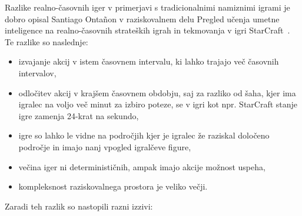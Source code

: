 \documentclass[a4paper, 12pt]{book}
\begin{document}
Razlike realno-časovnih iger v primerjavi s tradicionalnimi namiznimi igrami je dobro opisal Santiago Ontañon v raziskovalnem delu Pregled učenja umetne inteligence na realno-časovnih strateških igrah in tekmovanja v igri StarCraft~\cite{survey_real_time_strategy_ai_research_starcraft}.
Te razlike so naslednje:
\begin{itemize}
	\item izvajanje akcij v istem časovnem intervalu, ki lahko trajajo več časovnih intervalov,
	\item odločitev akcij v krajšem časovnem obdobju, saj za razliko od šaha, kjer ima igralec na voljo več minut za izbiro poteze, se v igri kot npr. StarCraft stanje igre zamenja 24-krat na sekundo,
	\item igre so lahko le vidne na področjih kjer je igralec že raziskal določeno področje in imajo nanj vpogled igralčeve figure,
	\item večina iger ni determinističnih, ampak imajo akcije možnost uspeha,
	\item kompleksnost raziskovalnega prostora je veliko večji.
\end{itemize}
\noindent
Zaradi teh razlik so nastopili razni izzivi:
\end{document}
